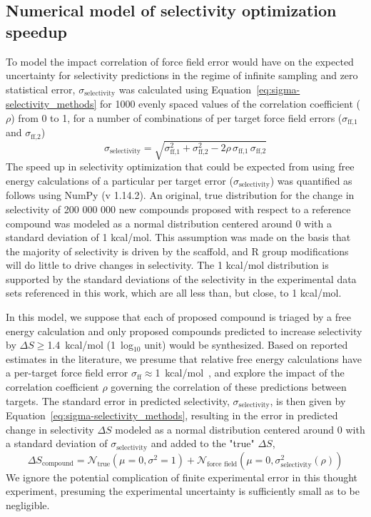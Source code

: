\documentclass[phd,tocprelim]{cornell}
\begin{document}
\subsection{Numerical model of selectivity optimization speedup}
To model the impact correlation of force field error would have on the expected uncertainty for selectivity predictions in the regime of infinite sampling and zero statistical error, $\sigma_\text{selectivity}$ was calculated using Equation~\ref{eq:sigma-selectivity_methods} for 1000 evenly spaced values of the correlation coefficient ($\rho$) from 0 to 1, for a number of combinations of per target force field errors ($\sigma_\text{ff,1}$ and $\sigma_\text{ff,2}$) 
\begin{equation}\label{eq:sigma-selectivity_methods}
\sigma_\text{selectivity} = \sqrt{\sigma_\text{ff,1}^2 + \sigma_\text{ff,2}^2 - 2 \rho \, \sigma_\text{ff,1} \, \sigma_\text{ff,2}}
\end{equation}
The speed up in selectivity optimization that could be expected from using free energy calculations of a particular per target error ($\sigma_\text{selectivity}$) was quantified as follows using NumPy (v 1.14.2). 
An original, true distribution for the change in selectivity of 200 000 000 new compounds proposed with respect to a reference compound was modeled as a normal distribution centered around 0 with a standard deviation of 1 kcal/mol. 
This assumption was made on the basis that the majority of selectivity is driven by the scaffold, and R group modifications will do little to drive changes in selectivity. The 1 kcal/mol distribution is supported by the standard deviations of the selectivity in the experimental data sets referenced in this work, which are all less than, but close, to 1 kcal/mol. 

In this model, we suppose that each of proposed compound is triaged by a free energy calculation and only proposed compounds predicted to increase selectivity by $\Delta S \ge $1.4~kcal/mol (1~log$_{10}$ unit) would be synthesized.
Based on reported estimates in the literature, 
we presume that relative free energy calculations have a per-target force field error $\sigma_\text{ff} \approx $1~kcal/mol~\citep{Harder:J.Chem.TheoryComput.:2016}, and explore the impact of the correlation coefficient $\rho$ governing the correlation of these predictions between targets. 
The standard error in predicted selectivity, $\sigma_\text{selectivity}$, is then given by Equation~\ref{eq:sigma-selectivity_methods}, resulting in the error in predicted change in selectivity $\Delta S$ modeled as a normal distribution centered around 0 with a standard deviation of $\sigma_\text{selectivity}$ and added to the "true" $\Delta S$,
\begin{equation}\label{eq14}
\Delta S_\text{compound} = \mathcal{N}_\text{true}(\mu =0, \sigma^2 = 1) + \mathcal{N}_\text{force field}(\mu =0, \sigma_\text{selectivity}^2(\rho))
\end{equation}
We ignore the potential complication of finite experimental error in this thought experiment, presuming the experimental uncertainty is sufficiently small as to be negligible.
\end{document}
